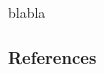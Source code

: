 \documentclass{beamer}
\begin{document}
    \begin{frame}
        \begin{block}{}
            blabla \cite{Augustin}
        \end{block}
    \end{frame}

    \begin{frame}[t,allowframebreaks]
        \frametitle{References}
        \printbibliography
    \end{frame}
\end{document}
